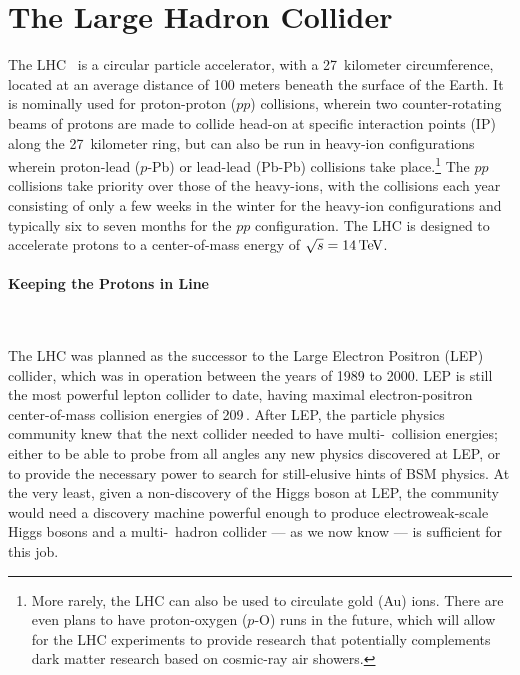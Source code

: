 \section{The Large Hadron Collider}
\label{sec:lhc}

The LHC~\cite{LHCMachine} is a circular particle accelerator, with a 27~kilometer circumference,
located at an average distance of 100 meters beneath the surface of the Earth.
It is nominally used for proton-proton ($pp$) collisions, wherein two counter-rotating
beams of protons are made to collide head-on at specific interaction points (IP) along the 27~kilometer
ring, but can also be run in heavy-ion configurations wherein proton-lead ($p$-Pb) or lead-lead (Pb-Pb)
collisions take place.\footnote{More rarely, the LHC can also be used to circulate gold (Au) ions.
There are even plans to have proton-oxygen ($p$-O) runs in the future, which will allow
for the LHC experiments to provide research that potentially complements dark matter research
based on cosmic-ray air showers.}
The $pp$ collisions take priority over those of the heavy-ions, with the collisions each year
consisting of only a few weeks in the winter for the heavy-ion configurations and typically
six to seven months for the $pp$ configuration. The LHC is designed to accelerate protons to a
center-of-mass energy of $\sqrt{s} = 14\,\text{Te\kern -0.1em V}$.

\paragraph{Keeping the Protons in Line} \mbox{} \\
\label{sec:dipole}

The LHC was planned as the successor to the Large Electron Positron (LEP) collider, which was in operation
between the years of 1989 to 2000. LEP is still the most powerful lepton collider to date, having maximal electron-positron
center-of-mass collision energies of 209\,\GeV.
After LEP, the particle physics community knew that the next collider needed to have multi-\TeV~collision
energies; either to be able to probe from all angles any new physics discovered at LEP, or
to provide the necessary power to search for still-elusive hints of BSM physics. At the very least,
given a non-discovery of the Higgs boson at LEP, the community would need a discovery machine powerful enough
to produce electroweak-scale Higgs bosons and a multi-\TeV~hadron collider --- as we now know --- is sufficient for this job.


